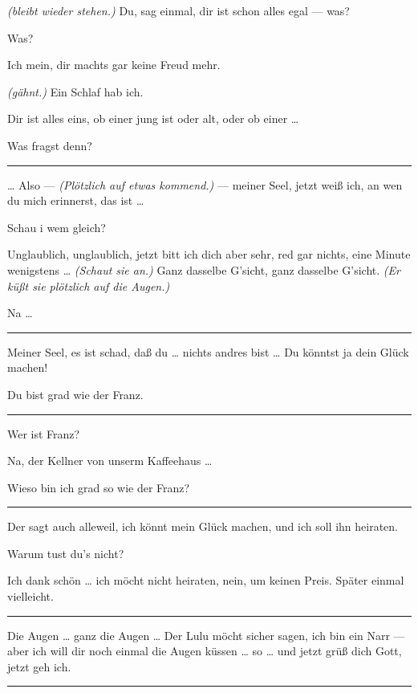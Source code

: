 \documentclass[
	final,
	a4paper,
	ngerman,
	mpinclude = true, %
	twoside = true,
	open = right,
	cleardoublepage = plain,
	DIV = 13,
	BCOR = 1cm,
	titlepage = firstiscover,
	]{scrbook}
\newcommand{\direction}[1]{\textit{(#1)}}
\newenvironment{deletion}{%
		\vspace{0.25\baselineskip}
		\hrule
		\vspace{0.25\baselineskip}
		\color{darkgray}
	}{
		\color{black}
		\vspace{0.25\baselineskip}
		\hrule 
		\vspace{0.25\baselineskip}
	}
\newcommand{\thecharacter}[1]{\textup{\textsc{#1}}\xspace}
\newcommand{\thenutte}{\thecharacter{Leocadia}}
\newcommand{\theentrepeneurin}{\thecharacter{Katerina Albrecht}}
\newcommand{\character}[1]{\item[#1:]}
\newcommand{\nutte}{\character{\thenutte}}
\newcommand{\entrepeneurin}{\character{\theentrepeneurin}}
\begin{document}
\begin{play}
	\entrepeneurin
	\direction{bleibt wieder stehen.} Du, sag einmal, dir ist schon alles egal --- was?

	\nutte
	Was?

	\entrepeneurin
	Ich mein, dir machts gar keine Freud mehr.

	\nutte
	\direction{gähnt.} Ein Schlaf hab ich.

	\entrepeneurin
	Dir ist alles eins, ob einer jung ist oder alt, oder ob einer \ldots{}

	\nutte
	Was fragst denn?

	\begin{deletion}
	\entrepeneurin
	\ldots{} Also --- \direction{Plötzlich auf etwas kommend.} --- meiner Seel, jetzt weiß ich, an wen du mich erinnerst, das ist \ldots{}

	\nutte
	Schau i wem gleich?

	\entrepeneurin
	Unglaublich, unglaublich, jetzt bitt ich dich aber sehr, red gar nichts, eine Minute wenigstens \ldots{} \direction{Schaut sie an.} Ganz dasselbe G'sicht, ganz dasselbe G'sicht. \direction{Er küßt sie plötzlich auf die Augen.}

	\nutte
	Na \ldots{}

	\end{deletion}
	\entrepeneurin
	Meiner Seel, es ist schad, daß du \ldots{} nichts andres bist \ldots{} Du könntst ja dein Glück machen!

	\nutte
	Du bist grad wie der Franz.

	\begin{deletion}
	\entrepeneurin
	Wer ist Franz?

	\nutte
	Na, der Kellner von unserm Kaffeehaus \ldots{}

	\entrepeneurin
	Wieso bin ich grad so wie der Franz?

	\end{deletion}
	\nutte
	Der sagt auch alleweil, ich könnt mein Glück machen, und ich soll ihn heiraten.

	\entrepeneurin
	Warum tust du's nicht?

	\nutte
	Ich dank schön \ldots{} ich möcht nicht heiraten, nein, um keinen Preis. Später einmal vielleicht.

	\begin{deletion}
	\entrepeneurin
	Die Augen \ldots{} ganz die Augen \ldots{} Der Lulu möcht sicher sagen, ich bin ein Narr --- aber ich will dir noch einmal die Augen küssen \ldots{} so \ldots{} und jetzt grüß dich Gott, jetzt geh ich.


\end{deletion}
\end{play}
\end{document}
